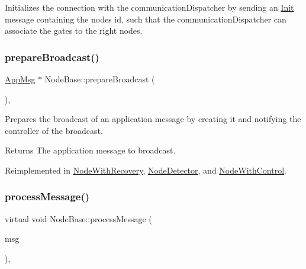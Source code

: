 Initializes the connection with the communication\+Dispatcher by sending an \hyperlink{class_init}{Init} message containing the node\textquotesingle{}s id, such that the communication\+Dispatcher can associate the gates to the right nodes. 

\mbox{\label{class_node_base_a66c1dee9d15119bc3e68da71067ff6cd}} 
\subsubsection{\texorpdfstring{prepare\+Broadcast()}{prepareBroadcast()}}
{\footnotesize\ttfamily \hyperlink{class_app_msg}{App\+Msg} $\ast$ Node\+Base\+::prepare\+Broadcast (\begin{DoxyParamCaption}{ }\end{DoxyParamCaption})\hspace{0.3cm}{\ttfamily [protected]}, {\ttfamily [virtual]}}



Prepares the broadcast of an application message by creating it and notifying the controller of the broadcast. 

\begin{DoxyReturn}{Returns}
The application message to broadcast. 
\end{DoxyReturn}


Reimplemented in \hyperlink{class_node_with_recovery_a33d8e8775fd69cb647b38a54b36e1ebe}{Node\+With\+Recovery}, \hyperlink{class_node_detector_af75cf37cc01fc51bc228a7a83c10cb97}{Node\+Detector}, and \hyperlink{class_node_with_control_ab871014cf3f42d834f8d34ad5498174c}{Node\+With\+Control}.

\mbox{\label{class_node_base_ae70b168f2bc7407c249594b1c614301c}} 
\subsubsection{\texorpdfstring{process\+Message()}{processMessage()}}
{\footnotesize\ttfamily virtual void Node\+Base\+::process\+Message (\begin{DoxyParamCaption}\item[{c\+Message $\ast$}]{msg }\end{DoxyParamCaption})\hspace{0.3cm}{\ttfamily [protected]}, {}}



